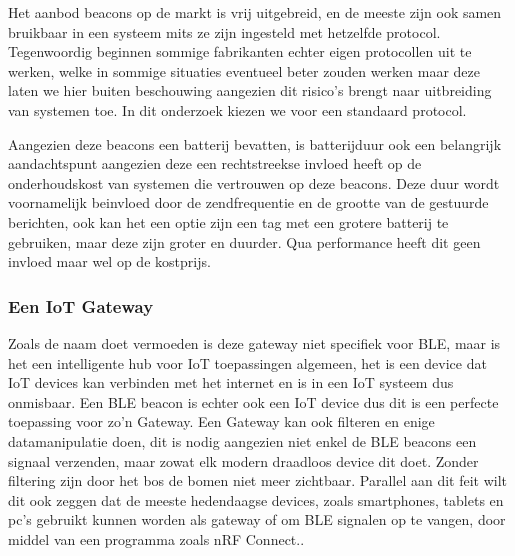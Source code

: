 Het aanbod beacons op de markt is vrij uitgebreid, en de meeste zijn ook samen bruikbaar in een systeem mits ze zijn ingesteld met hetzelfde protocol. Tegenwoordig beginnen sommige fabrikanten echter eigen protocollen uit te werken, welke in sommige situaties eventueel beter zouden werken maar deze laten we hier buiten beschouwing aangezien dit risico's brengt naar uitbreiding van systemen toe. In dit onderzoek kiezen we voor een standaard protocol.

Aangezien deze beacons een batterij bevatten, is batterijduur ook een belangrijk aandachtspunt aangezien deze een rechtstreekse invloed heeft op de onderhoudskost van systemen die vertrouwen op deze beacons. Deze duur wordt voornamelijk beinvloed door de zendfrequentie en de grootte van de gestuurde berichten, ook kan het een optie zijn een tag met een grotere batterij te gebruiken, maar deze zijn groter en duurder. Qua performance heeft dit geen invloed maar wel op de kostprijs. 

\subsubsection{Een IoT Gateway}
Zoals de naam doet vermoeden is deze gateway niet specifiek voor BLE, maar is het een intelligente hub voor IoT toepassingen algemeen, het is een device dat IoT devices kan verbinden met het internet en is in een IoT systeem dus onmisbaar. Een BLE beacon is echter ook een IoT device dus dit is een perfecte toepassing voor zo'n Gateway.\autocite{MultiTech2022} Een Gateway kan ook filteren en enige datamanipulatie doen, dit is nodig aangezien niet enkel de BLE beacons een signaal verzenden, maar zowat elk modern draadloos device dit doet. Zonder filtering zijn door het bos de bomen niet meer zichtbaar. Parallel aan dit feit wilt dit ook zeggen dat de meeste hedendaagse devices, zoals smartphones, tablets en pc's gebruikt kunnen worden als gateway of om BLE signalen op te vangen, door middel van een programma zoals nRF Connect.\autocite{Semiconductor2022}.

